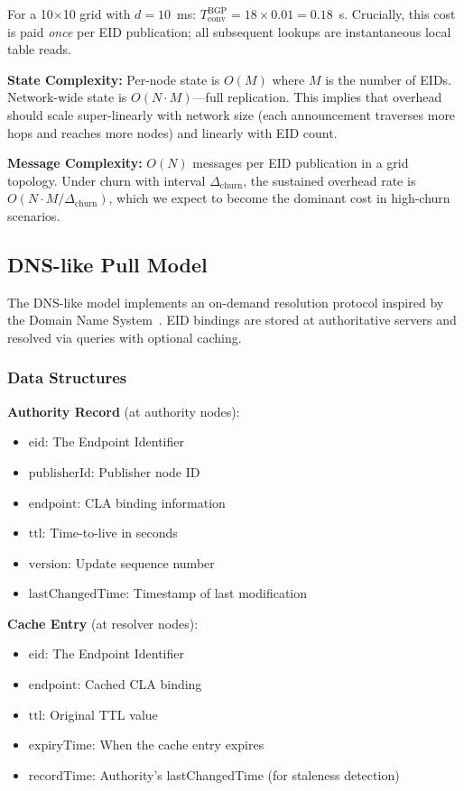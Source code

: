 \documentclass[journal,twocolumn]{IEEEtran}
\begin{document}
For a 10$\times$10 grid with $d = 10$~ms: $T_{\text{conv}}^{\text{BGP}} = 18 \times 0.01 = 0.18$~s. Crucially, this cost is paid \emph{once} per EID publication; all subsequent lookups are instantaneous local table reads.

\textbf{State Complexity:} Per-node state is $O(M)$ where $M$ is the number of EIDs. Network-wide state is $O(N \cdot M)$---full replication. This implies that overhead should scale super-linearly with network size (each announcement traverses more hops and reaches more nodes) and linearly with EID count.

\textbf{Message Complexity:} $O(N)$ messages per EID publication in a grid topology. Under churn with interval $\Delta_{\text{churn}}$, the sustained overhead rate is $O(N \cdot M / \Delta_{\text{churn}})$, which we expect to become the dominant cost in high-churn scenarios.

\subsection{DNS-like Pull Model}
\label{sec_dns_model}

The DNS-like model implements an on-demand resolution protocol inspired by the Domain Name System~\cite{rfc1035}. 
EID bindings are stored at authoritative servers and resolved via queries with optional caching.

\subsubsection{Data Structures}

\textbf{Authority Record} (at authority nodes):
\begin{itemize}
    \item $\text{eid}$: The Endpoint Identifier
    \item $\text{publisherId}$: Publisher node ID
    \item $\text{endpoint}$: CLA binding information
    \item $\text{ttl}$: Time-to-live in seconds
    \item $\text{version}$: Update sequence number
    \item $\text{lastChangedTime}$: Timestamp of last modification
\end{itemize}

\textbf{Cache Entry} (at resolver nodes):
\begin{itemize}
    \item $\text{eid}$: The Endpoint Identifier
    \item $\text{endpoint}$: Cached CLA binding
    \item $\text{ttl}$: Original TTL value
    \item $\text{expiryTime}$: When the cache entry expires
    \item $\text{recordTime}$: Authority's lastChangedTime (for staleness detection)
\end{itemize}
\end{document}
